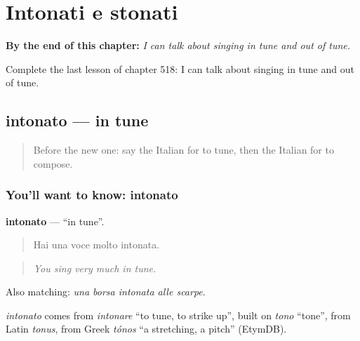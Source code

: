 
\chapter{Intonati e stonati}
\label{ch:it-intonati-e-stonati}

\begin{chapteropening}
\textbf{By the end of this chapter:} \emph{I can talk about singing in tune and out of tune.}

Complete the last lesson of chapter 518: I can talk about singing in tune and out of tune.
\end{chapteropening}

\section[intonato]{intonato — in tune}

\label{lesson:IT-C518-intonato}



\begin{quote}
Before the new one: say the Italian for to tune, then the Italian for to compose.
\end{quote}

\subsection*{You'll want to know: intonato}
\textbf{intonato} — \textquotedblleft{}in tune\textquotedblright{}.

\begin{quote}
Hai una voce molto intonata.
\end{quote}

\begin{quote}
\emph{You sing very much in tune.}
\end{quote}

Also matching: \emph{una borsa intonata alle scarpe}.

\begin{cousinweb}
\emph{intonato} comes from \emph{intonare} \textquotedblleft{}to tune, to strike up\textquotedblright{}, built on \emph{tono} \textquotedblleft{}tone\textquotedblright{}, from Latin \emph{tonus}, from Greek \emph{tónos} \textquotedblleft{}a stretching, a pitch\textquotedblright{} (EtymDB).
\end{cousinweb}

